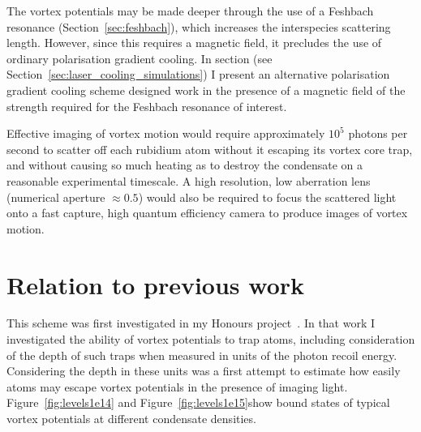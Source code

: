 The vortex potentials may be made deeper through the use of a Feshbach resonance (Section~\ref{sec:feshbach}), which increases the interspecies scattering length. However, since this requires a magnetic field, it precludes the use of ordinary polarisation gradient cooling. In section (see Section~\ref{sec:laser_cooling_simulations}) I present an alternative polarisation gradient cooling scheme designed work in the presence of a magnetic field of the strength required for the Feshbach resonance of interest.

Effective imaging of vortex motion would require approximately $10^5$ photons per second to scatter off each rubidium atom without it escaping its vortex core trap, and without causing so much heating as to destroy the condensate on a reasonable experimental timescale. A high resolution, low aberration lens (numerical aperture $\approx 0.5$) would also be required to focus the scattered light onto a fast capture, high quantum efficiency camera to produce images of vortex motion.

\section{Relation to previous work}

This scheme was first investigated in my Honours project~\cite{billington_particle_2010}. In that work I investigated the ability of vortex potentials to trap atoms, including consideration of the depth of such traps when measured in units of the photon recoil energy. Considering the depth in these units was a first attempt to estimate how easily atoms may escape vortex potentials in the presence of imaging light. Figure~\ref{fig:levels1e14} and Figure~\ref{fig:levels1e15}show bound states of typical vortex potentials at different condensate densities.

